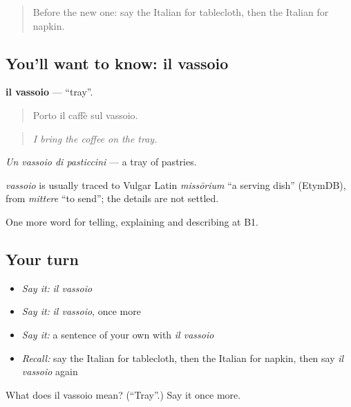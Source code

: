 \label{lesson:IT-C533-vassoio}



\begin{quote}
Before the new one: say the Italian for tablecloth, then the Italian for napkin.
\end{quote}

\subsection*{You'll want to know: il vassoio}
\textbf{il vassoio} — \textquotedblleft{}tray\textquotedblright{}.

\begin{quote}
Porto il caffè sul vassoio.
\end{quote}

\begin{quote}
\emph{I bring the coffee on the tray.}
\end{quote}

\emph{Un vassoio di pasticcini} — a tray of pastries.

\begin{cousinweb}
\emph{vassoio} is usually traced to Vulgar Latin \emph{missōrium} \textquotedblleft{}a serving dish\textquotedblright{} (EtymDB), from \emph{mittere} \textquotedblleft{}to send\textquotedblright{}; the details are not settled.
\end{cousinweb}

\begin{grammarlens}[title={What you've built}]
One more word for telling, explaining and describing at B1.
\end{grammarlens}

\subsection*{Your turn}
\begin{itemize}
\raggedright
  \item \emph{Say it:} \emph{il vassoio}
  \item \emph{Say it:} \emph{il vassoio}, once more
  \item \emph{Say it:} a sentence of your own with \emph{il vassoio}
  \item \emph{Recall:} say the Italian for tablecloth, then the Italian for napkin, then say \emph{il vassoio} again
\end{itemize}

\begin{tcolorbox}[breakable,colback=teal!4,colframe=teal!35!black,title={Before you move on}]
What does il vassoio mean? (\textquotedblleft{}Tray\textquotedblright{}.) Say it once more.
\end{tcolorbox}
